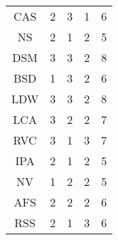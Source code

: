 \begin{table}[H]
\begin{tabular}{|c|c|c|c|c|}
CAS  & 2                                                                             & 3                                                                         & 1              & 6     \\
NS   & 2                                                                             & 1                                                                         & 2              & 5     \\
DSM  & 3                                                                             & 3                                                                         & 2              & 8     \\
BSD  & 1                                                                             & 3                                                                         & 2              & 6     \\
LDW  & 3                                                                             & 3                                                                         & 2              & 8     \\
LCA  & 3                                                                             & 2                                                                         & 2              & 7     \\
RVC  & 3                                                                             & 1                                                                         & 3              & 7     \\
IPA  & 2                                                                             & 1                                                                         & 2              & 5     \\
NV   & 1                                                                             & 2                                                                         & 2              & 5     \\
AFS  & 2                                                                             & 2                                                                         & 2              & 6     \\
RSS  & 2                                                                             & 1                                                                         & 3              & 6  \\\hline  
\end{tabular}
\end{table}

